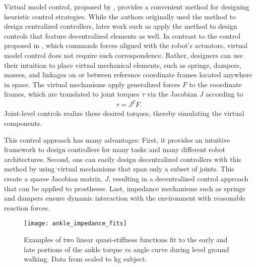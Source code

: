 Virtual model control, proposed by \citet{pratt2001virtual}, provides a
convenient method for designing heuristic control strategies. While the authors
originally used the method to design centralized controllers, later work such as
\citet{ajallooeian2013central} apply the method to design controls that feature
decentralized elements as well. In contrast to the control proposed in
\citet{raibert1983dynamically}, which commands forces aligned with the robot's
actuators, virtual model control does not require such correspondence. Rather,
designers can use their intuition to place virtual mechanical elements, such as
springs, dampers, masses, and linkages on or between reference coordinate frames
located anywhere in space.  The virtual mechanisms apply generalized forces $F$
to the coordinate frames, which are translated to joint torques $\tau$ via the
Jacobian $J$ according to
\begin{align}
    \tau = J^T F.
\end{align}
Joint-level controls realize these desired torques, thereby simulating the
virtual components. 

This control approach has many advantages: First, it provides an intuitive
framework to design controllers for many tasks and many different robot
architectures. Second, one can easily design decentralized controllers with this
method by using virtual mechanisms that span only a subset of joints. This
create a sparse Jacobian matrix, $J$, resulting in a decentralized control
approach that can be applied to prostheses. Last, impedance mechanisms such as
springs and dampers ensure dynamic interaction with the environment with
reasonable reaction forces.

\begin{figure}[t]
    \centering
    \texttt{[image: ankle\_impedance\_fits]}
    \caption{Examples of two linear quasi-stiffness functions fit to the early
    and late portions of the ankle torque vs angle curve during level ground
    walking. Data from \citet{winter2009biomechanics} scaled to \unit[85]{kg}
    subject.}
    \label{fig:ankle_impedance_fits}
\end{figure}
